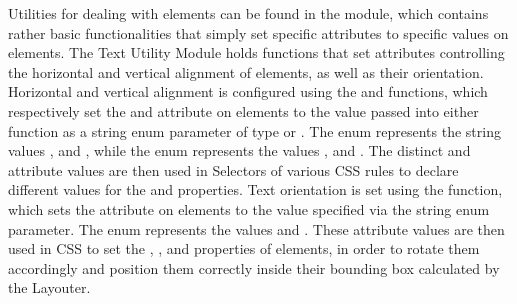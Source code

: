Utilities for dealing with  elements can be found in the  module, which contains rather basic functionalities that simply set specific  attributes to specific values on  elements.
The Text Utility Module holds functions that set  attributes controlling the horizontal and vertical alignment of  elements, as well as their orientation.
Horizontal and vertical alignment is configured using the  and  functions, which respectively set the  and  attribute on  elements to the value passed into either function as a string enum parameter of type  or .
The  enum represents the string values ,  and , while the  enum represents the values ,  and .
The distinct  and  attribute values are then used in Selectors of various CSS rules to declare different values for the  and  properties.
Text orientation is set using the  function, which sets the  attribute on  elements to the value specified via the  string enum parameter.
The  enum represents the values  and .
These  attribute values are then used in CSS to set the , , and  properties of  elements, in order to rotate them accordingly and position them correctly inside their bounding box calculated by the Layouter.


